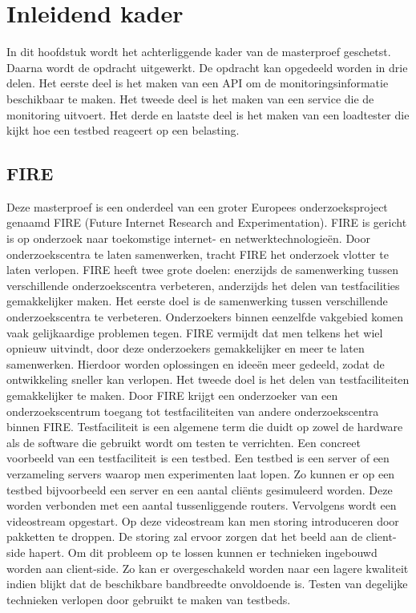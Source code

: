 \chapter{Inleidend kader}
{\samenvatting
In dit hoofdstuk wordt het achterliggende kader van de masterproef geschetst. Daarna wordt de opdracht uitgewerkt. De opdracht kan opgedeeld worden in drie delen. Het eerste deel is het maken van een API om de monitoringsinformatie beschikbaar te maken. Het tweede deel is het maken van een service die de monitoring uitvoert. Het derde en laatste deel is het maken van een loadtester die kijkt hoe een testbed reageert op een belasting.}

\section{FIRE}
\npar
Deze masterproef is een onderdeel van een groter Europees onderzoeksproject genaamd FIRE (Future Internet Research and Experimentation). FIRE is gericht is op onderzoek naar toekomstige internet- en netwerktechnologie\"en. Door onderzoekscentra te laten samenwerken\citep{Fire-what-is}, tracht FIRE het onderzoek vlotter te laten verlopen. FIRE heeft twee grote doelen: enerzijds de samenwerking tussen verschillende onderzoekscentra verbeteren, anderzijds het delen van testfacilities gemakkelijker maken.
\npar
Het eerste doel is de samenwerking tussen verschillende onderzoekscentra te verbeteren. Onderzoekers binnen eenzelfde vakgebied komen vaak gelijkaardige problemen tegen. FIRE vermijdt dat men telkens het wiel opnieuw uitvindt, door deze onderzoekers gemakkelijker en meer te laten samenwerken. Hierdoor worden oplossingen en idee\"en meer gedeeld, zodat de ontwikkeling sneller kan verlopen.
\clearpage
\npar
Het tweede doel is het delen van testfaciliteiten gemakkelijker te maken. Door FIRE krijgt een onderzoeker van een onderzoekscentrum toegang tot testfaciliteiten van andere onderzoekscentra binnen FIRE. Testfaciliteit is een algemene term die duidt op zowel de hardware als de software die gebruikt wordt om testen te verrichten. Een concreet voorbeeld van een testfaciliteit is een testbed. Een testbed is een server of een verzameling servers waarop men experimenten laat lopen. 
\npar
Zo kunnen er op een testbed bijvoorbeeld een server en een aantal cli\"ents gesimuleerd worden. Deze worden verbonden met een aantal tussenliggende routers. Vervolgens wordt een videostream opgestart. Op deze videostream kan men storing introduceren door pakketten te droppen. De storing zal ervoor zorgen dat het beeld aan de client-side hapert. Om dit probleem op te lossen kunnen er technieken ingebouwd worden aan client-side. Zo kan er overgeschakeld worden naar een lagere kwaliteit indien blijkt dat de beschikbare bandbreedte onvoldoende is. Testen van degelijke technieken verlopen door gebruikt te maken van testbeds.

